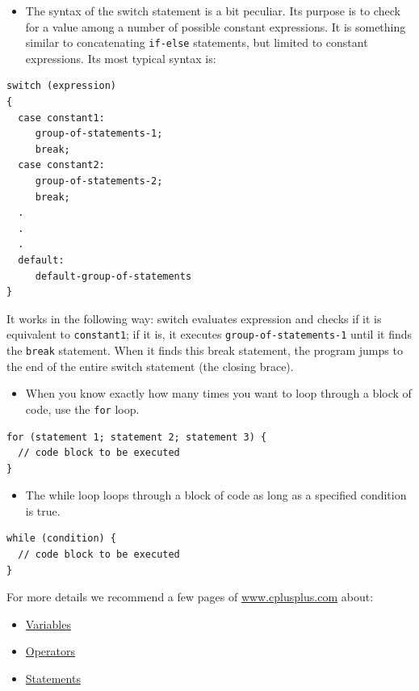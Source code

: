 \begin{itemize}
\tightlist
\item
  The syntax of the switch statement is a bit peculiar. Its purpose is to check for a value among a number of possible constant expressions. It is something similar to concatenating \texttt{if-else} statements, but limited to constant expressions. Its most typical syntax is:
\end{itemize}

\begin{verbatim}
switch (expression)
{
  case constant1:
     group-of-statements-1;
     break;
  case constant2:
     group-of-statements-2;
     break;
  .
  .
  .
  default:
     default-group-of-statements
}
\end{verbatim}

It works in the following way: switch evaluates expression and checks if it is equivalent to \texttt{constant1}; if it is, it executes \texttt{group-of-statements-1} until it finds the \texttt{break} statement. When it finds this break statement, the program jumps to the end of the entire switch statement (the closing brace).

\begin{itemize}
\tightlist
\item
  When you know exactly how many times you want to loop through a block of code, use the \texttt{for} loop.
\end{itemize}

\begin{verbatim}
for (statement 1; statement 2; statement 3) {
  // code block to be executed
}
\end{verbatim}

\begin{itemize}
\tightlist
\item
  The while loop loops through a block of code as long as a specified condition is true.
\end{itemize}

\begin{verbatim}
while (condition) {
  // code block to be executed
}
\end{verbatim}

For more details we recommend a few pages of \href{https://www.cplusplus.com/}{www.cplusplus.com} about:

\begin{itemize}
\tightlist
\item
  \href{https://www.cplusplus.com/doc/tutorial/variables/}{Variables}
\item
  \href{https://www.cplusplus.com/doc/tutorial/operators/}{Operators}
\item
  \href{https://www.cplusplus.com/doc/tutorial/control/}{Statements}
\end{itemize}

